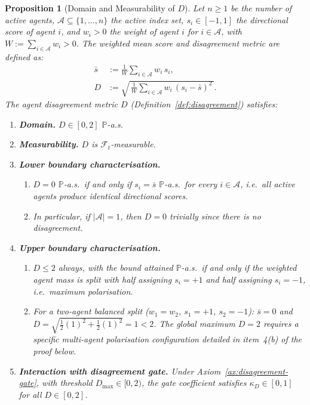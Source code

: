\documentclass[12pt,openany]{book}
\newcommand{\calF}{\mathcal{F}}
\newcommand{\Prob}{\mathbb{P}}
\numberwithin{equation}{chapter}
\theoremstyle{plain}
\newtheorem{proposition}[theorem]{Proposition}
\theoremstyle{definition}
\theoremstyle{remark}
\numberwithin{equation}{chapter}
\theoremstyle{plain}
\begin{document}
\begin{proposition}[Domain and Measurability of $D$]
\label{prop:D-domain}
Let $n \geq 1$ be the number of active agents,
$\mathcal{A} \subseteq \{1,\ldots,n\}$ the active index set,
$s_i \in [-1,1]$ the directional score of agent $i$,
and $w_i > 0$ the weight of agent $i$ for $i \in \mathcal{A}$,
with $W := \sum_{i \in \mathcal{A}} w_i > 0$.
The weighted mean score and disagreement metric are defined as:
\begin{align}
  \bar{s}
    &:= \frac{1}{W}\sum_{i \in \mathcal{A}} w_i\, s_i,
  \\[4pt]
  D
    &:= \sqrt{\,\frac{1}{W}\sum_{i \in \mathcal{A}}
        w_i\,(s_i - \bar{s})^2\,}.
\end{align}
The agent disagreement metric $D$
(Definition~\ref{def:disagreement}) satisfies:
\begin{enumerate}
  \item \textbf{Domain.} $D \in [0,2]$ $\Prob$-a.s.
  \item \textbf{Measurability.} $D$ is $\calF_t$-measurable.
  \item \textbf{Lower boundary characterisation.}
    \begin{enumerate}
      \item $D = 0$ $\Prob$-a.s.\ if and only if
        $s_i = \bar{s}$ $\Prob$-a.s.\ for every
        $i \in \mathcal{A}$, i.e.\ all active agents
        produce identical directional scores.
      \item In particular, if $|\mathcal{A}| = 1$, then
        $D = 0$ trivially since there is no disagreement.
    \end{enumerate}
  \item \textbf{Upper boundary characterisation.}
    \begin{enumerate}
      \item $D \leq 2$ always, with the bound attained
        $\Prob$-a.s.\ if and only if the weighted agent
        mass is split with half assigning $s_i = +1$ and
        half assigning $s_i = -1$, i.e.\
        maximum polarisation.
      \item For a two-agent balanced split
        ($w_1 = w_2$, $s_1 = +1$, $s_2 = -1$):
        $\bar{s} = 0$ and
        $D = \sqrt{\tfrac{1}{2}(1)^2 + \tfrac{1}{2}(1)^2}
           = 1 < 2$.
        The global maximum $D = 2$ requires a specific
        multi-agent polarisation configuration detailed
        in item~4(b) of the proof below.
    \end{enumerate}
  \item \textbf{Interaction with disagreement gate.}
    Under Axiom~\ref{ax:disagreement-gate}, with threshold
    $D_{\max} \in [0,2)$, the gate coefficient satisfies
    $\kappa_D \in [0,1]$ for all $D \in [0,2]$.
\end{enumerate}
\end{proposition}
\end{document}
